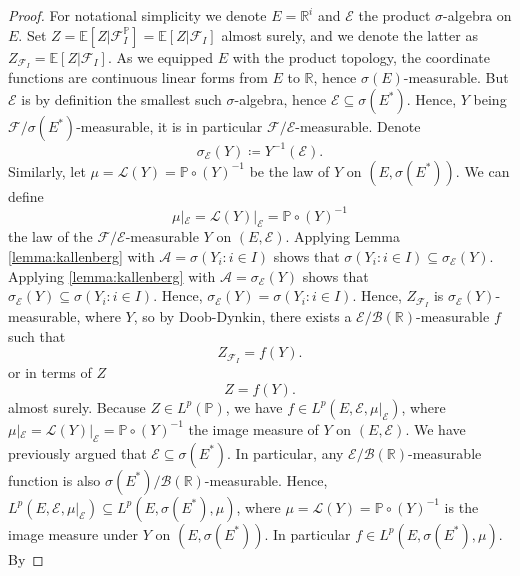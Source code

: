 \documentclass[11pt,a4paper,twoside,openany]{report}
\numberwithin{equation}{section}
\theoremstyle{plain} %
\theoremstyle{definition} %
\theoremstyle{remark} %
\begin{document}
\begin{proof}
    For notational simplicity we denote \(E=\mathbb{R}^i\) and \(\mathcal{E}\) the product \(\sigma\)-algebra on \(E\).
    Set \(Z=\mathbb{E}[Z|\mathcal{F}_I^{\mathbb{P}}]=\mathbb{E}[Z|\mathcal{F}_I]\) almost surely, and we denote the latter as \(Z_{\mathcal{F}_I}=\mathbb{E}[Z|\mathcal{F}_I]\). 
    As we equipped \(E\) with the product topology, the coordinate functions are continuous linear forms from \(E\) to \(\mathbb{R}\), hence \(\sigma(E)\)-measurable. But \(\mathcal{E}\) is by definition the smallest such \(\sigma\)-algebra, hence \(\mathcal{E}\subseteq\sigma(E^*)\). Hence, 
    \(Y\) being \(\mathcal{F}/\sigma(E^*)\)-measurable, it is in particular \(\mathcal{F}/\mathcal{E}\)-measurable. Denote 
    \begin{equation*}
        \sigma_{\mathcal{E}}(Y)\coloneqq Y^{-1}(\mathcal{E}).
    \end{equation*}
 Similarly, let \(\mu=\mathcal{L}(Y)=\mathbb{P}\circ(Y)^{-1}\) be the law of \(Y\) on \((E,\sigma(E^*))\). We can define 
    \begin{equation*}
        \mu|_{\mathcal{E}}=\mathcal{L}(Y)|_{\mathcal{E}}=\mathbb{P}\circ(Y)^{-1}
    \end{equation*}
    the law of the \(\mathcal{F}/\mathcal{E}\)-measurable \(Y\) on \((E,\mathcal{E})\).
    Applying Lemma \ref{lemma:kallenberg} with \(\mathcal{A}=\sigma(Y_i:i\in I)\) shows that \(\sigma(Y_i:i\in I)\subseteq\sigma_{\mathcal{E}}(Y)\). Applying \ref{lemma:kallenberg} with \(\mathcal{A}=\sigma_{\mathcal{E}}(Y)\) shows that \(\sigma_{\mathcal{E}}(Y)\subseteq\sigma(Y_i:i\in I)\). Hence, \(\sigma_{\mathcal{E}}(Y)=\sigma(Y_i:i\in I)\). Hence, \(Z_{\mathcal{F}_I}\) is \(\sigma_{\mathcal{E}}(Y)\)-measurable, where \(Y\), so by Doob-Dynkin, there exists a \(\mathcal{E}/\mathcal{B}(\mathbb{R})\)-measurable \(f\) such that 
    \begin{equation*}
        Z_{\mathcal{F}_I} = f(Y).
    \end{equation*}
    or in terms of \(Z\)
    \begin{equation*}
        Z = f(Y).
    \end{equation*}
    almost surely.  
 Because \(Z\in L^p(\mathbb{P})\), we have \(f\in L^p(E,\mathcal{E},\mu|_{\mathcal{E}})\), where \(\mu|_{\mathcal{E}}=\mathcal{L}(Y)|_{\mathcal{E}}=\mathbb{P}\circ(Y)^{-1}\) the image measure of \(Y\) on \((E,\mathcal{E})\). We have previously argued that \(\mathcal{E}\subseteq\sigma(E^*)\). In particular, any \(\mathcal{E}/\mathcal{B}(\mathbb{R})\)-measurable function is also \(\sigma(E^*)/\mathcal{B}(\mathbb{R})\)-measurable. Hence,  \(L^p(E,\mathcal{E},\mu|_{\mathcal{E}})\subseteq L^p(E,\sigma(E^*),\mu)\), where \(\mu=\mathcal{L}(Y)=\mathbb{P}\circ(Y)^{-1}\) is the image measure under \(Y\) on \((E,\sigma(E^*))\). In particular \(f\in L^p(E,\sigma(E^*),\mu)\). By

\end{proof}
\end{document}
